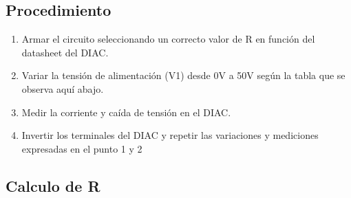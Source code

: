 \subsection{Procedimiento}
\begin{enumerate}
  \item Armar el circuito seleccionando un correcto valor de R en función del
    datasheet del DIAC.
  \item Variar la tensión de alimentación (V1) desde 0V a 50V según la tabla que se
    observa aquí abajo.
  \item Medir la corriente y caída de tensión en el DIAC.
  \item Invertir los terminales del DIAC y repetir las variaciones y mediciones
    expresadas en el punto 1 y 2
\end{enumerate}
\subsection{Calculo de R} %
